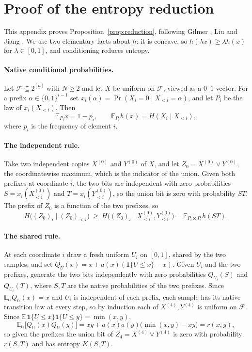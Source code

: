 \documentclass[12pt]{article}
\theoremstyle{plain}
\newcommand{\EE}{\mathbb{E}}
\newcommand{\cF}{\mathcal{F}}
\begin{document}
\appendix

\section{Proof of the entropy reduction}\label{app:reduction}

This appendix proves Proposition~\ref{prop:reduction}, following Gilmer \cite{Gil22}, Liu \cite{Liu23} and Jiang \cite{Jia26}. We use two elementary facts about $h$: it is concave, so $h(\lambda x)\ge\lambda h(x)$ for $\lambda\in[0,1]$, and conditioning reduces entropy.

\paragraph*{Native conditional probabilities.} Let $\cF\subseteq 2^{[n]}$ with $N\ge 2$ and let $X$ be uniform on $\cF$, viewed as a $0$--$1$ vector. For a prefix $\alpha\in\{0,1\}^{i-1}$ set $x_i(\alpha)=\Pr(X_i=0\mid X_{<i}=\alpha)$, and let $P_i$ be the law of $x_i(X_{<i})$. Then
\begin{equation}\label{eq:native}
\EE_{P_i}x=1-p_i,\qquad \EE_{P_i}h(x)=H(X_i\mid X_{<i}),
\end{equation}
where $p_i$ is the frequency of element $i$.

\paragraph*{The independent rule.} Take two independent copies $X^{(0)}$ and $Y^{(0)}$ of $X$, and let $Z_0=X^{(0)}\vee Y^{(0)}$, the coordinatewise maximum, which is the indicator of the union. Given both prefixes at coordinate $i$, the two bits are independent with zero probabilities $S=x_i(X^{(0)}_{<i})$ and $T=x_i(Y^{(0)}_{<i})$, so the union bit is zero with probability $ST$. The prefix of $Z_0$ is a function of the two prefixes, so
\begin{equation}\label{eq:Z0}
H\bigl((Z_0)_i\mid(Z_0)_{<i}\bigr)\ \ge\ H\bigl((Z_0)_i\mid X^{(0)}_{<i},Y^{(0)}_{<i}\bigr)=\EE_{P_i\otimes P_i}h(ST).
\end{equation}

\paragraph*{The shared rule.} At each coordinate $i$ draw a fresh uniform $U_i$ on $[0,1]$, shared by the two samples, and set $Q_{U}(x)=x+a(x)(\mathbf 1\{U\le x\}-x)$. Given $U_i$ and the two prefixes, generate the two bits independently with zero probabilities $Q_{U_i}(S)$ and $Q_{U_i}(T)$, where $S,T$ are the native probabilities of the two prefixes. Since $\EE_U Q_U(x)=x$ and $U_i$ is independent of each prefix, each sample has its native transition law at every step, so by induction each of $X^{(4)},Y^{(4)}$ is uniform on $\cF$. Since $\EE\,\mathbf 1\{U\le x\}\mathbf 1\{U\le y\}=\min(x,y)$,
\[
\EE_U\bigl[Q_U(x)Q_U(y)\bigr]=xy+a(x)a(y)\bigl(\min(x,y)-xy\bigr)=r(x,y),
\]
so given the prefixes the union bit of $Z_4=X^{(4)}\vee Y^{(4)}$ is zero with probability $r(S,T)$ and has entropy $K(S,T)$.
\end{document}
